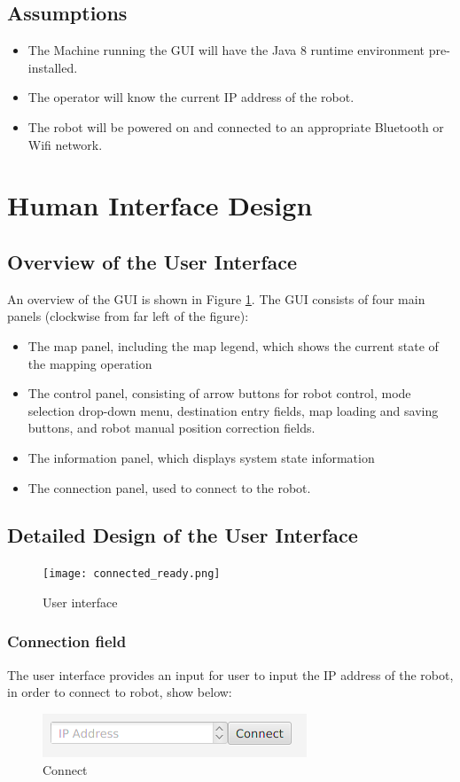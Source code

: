 \documentclass[12pt]{article}
\begin{document}
\subsection{Assumptions}

\begin{itemize}{}
\item The Machine running the GUI will have the Java 8 runtime environment pre-installed.
\item The operator will know the current IP address of the robot.
\item The robot will be powered on and connected to an appropriate Bluetooth or Wifi network.

\end{itemize}

\section{Human Interface Design}\label{GUI}

\subsection{Overview of the User Interface}
An overview of the GUI is shown in Figure \ref{fig:GUI}. The GUI consists of four main panels (clockwise from far left of the figure):
\begin{itemize}
\item The map panel, including the map legend, which shows the current state of the mapping operation
\item The control panel, consisting of arrow buttons for robot control, mode selection drop-down menu, destination entry fields, map loading and saving buttons, and robot manual position correction fields.
\item The information panel, which displays system state information
\item The connection panel, used to connect to the robot.
\end{itemize}
\subsection{Detailed Design of the User Interface}
\begin{figure}[H]
\texttt{[image: connected\_ready.png]}
\caption{User interface}
  \label{fig:GUI}
\end{figure}
\subsubsection{Connection field}
The user interface provides an input for user to input the IP address of the robot, in order to connect to robot, show below:
\begin{figure}[H]
\includegraphics[width=\textwidth]{connect.png}
\caption{Connect}
  \label{fig:Connect}
\end{figure}
\end{document}
